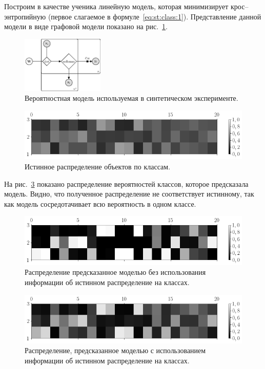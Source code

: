 \documentclass[12pt]{a&t}
\begin{document}
Построим в качестве ученика линейную модель, которая минимизирует крос--энтропийную (первое слагаемое в формуле~\eqref{eq:st:class:1}). Представление данной модели в виде графовой модели показано на рис.~\ref{fg:ex:synt:plate}.

\begin{figure}[h!t]\center
\includegraphics[width=0.35\textwidth]{figures/linear_model}
\caption{Вероятностная модель используемая в синтетическом эксперименте.}
\label{fg:ex:synt:plate}
\end{figure}

\begin{figure}[h!t]\center
\includegraphics[width=1\textwidth]{figures/syn_real_distr}
\caption{Истинное распределение  объектов по классам.}
\label{fg:ex:synt:distr:real}
\end{figure}


На рис.~\ref{fg:ex:synt:distr:without} показано распределение вероятностей классов, которое предсказала модель. Видно, что полученное распределение не соответствует истинному, так как модель сосредотачивает всю вероятность в одном классе.

\begin{figure}[h!t]\center
\includegraphics[width=1\textwidth]{figures/syn_without_teacher_distr}
\caption{Распределение предсказанное моделью без использования информации об истинном распределение на классах.}
\label{fg:ex:synt:distr:without}
\end{figure}

\begin{figure}[h!t]\center
\includegraphics[width=1\textwidth]{figures/syn_with_teacher_distr}
\caption{Распределение, предсказанное моделью с использованием информации об истинном распределение на классах.}
\label{fg:ex:synt:distr:with}
\end{figure}
\end{document}
